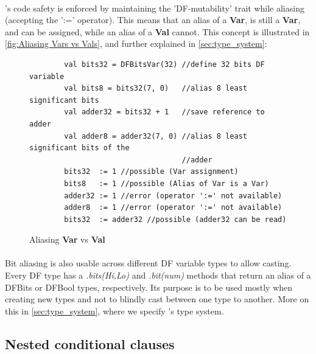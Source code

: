 \paragraph{}\cfns's code safety is enforced by maintaining the 'DF-mutability' trait while aliasing (accepting the ':=' operator). This means that an alias of a \textbf{Var}, is still a \textbf{Var}, and can be assigned, while an alias of a \textbf{Val} cannot. This concept is illustrated in \autoref{fig:Aliasing Vars vs Vals}, and further explained in \autoref{sec:type_system}:
\begin{figure}[h]
	\centering
	\begin{verbatim}
		val bits32 = DFBitsVar(32) //define 32 bits DF variable
		val bits8 = bits32(7, 0)   //alias 8 least significant bits 
		val adder32 = bits32 + 1   //save reference to adder
		val adder8 = adder32(7, 0) //alias 8 least significant bits of the 
		                           //adder
		bits32  := 1 //possible (Var assignment)
		bits8   := 1 //possible (Alias of Var is a Var)
		adder32 := 1 //error (operator ':=' not available)
		adder8  := 1 //error (operator ':=' not available)
		bits32  := adder32 //possible (adder32 can be read)
	\end{verbatim}
	\caption{Aliasing \textbf{Var} vs \textbf{Val}}\label{fig:Aliasing Vars vs Vals}
\end{figure}

\paragraph{}Bit aliasing is also usable across different DF variable types to allow casting. Every DF type has a \textit{.bits(Hi,Lo)} and \textit{.bit(num)} methods that return an alias of a DFBits or DFBool types, respectively. Its purpose is to be used mostly when creating new types and not to blindly cast between one type to another. More on this in \autoref{sec:type_system}, where we specify \cfns's type system.

 
\subsection{Nested conditional clauses}
\label{subsec:cond_clause}
